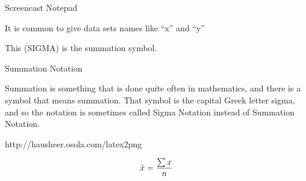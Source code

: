 
Screencast Notepad


It is common to give data sets names like “x” and “y”


This (SIGMA) is the summation symbol. 


Summation Notation

Summation is something that is done quite often in mathematics, and there is a symbol that means summation. That symbol is the capital Greek letter sigma, and so the notation is sometimes called Sigma Notation instead of Summation Notation.





http://hausheer.osola.com/latex2png


\begin{displaymath}

\bar{x} = {\sum x \over n}

\end{displaymath}



